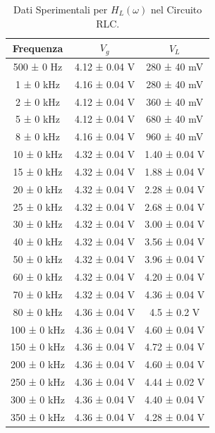 \documentclass[a4paper]{article}
\begin{document}
\begin{table}[htbp]
\centering
\begin{tabular}{|c|c|c|}
\hline
Frequenza & $V_g$ & $V_L$ \\\hline\hline
500 ± 0 Hz & 4.12 ± 0.04 V & 280 ± 40 mV \\
1 ± 0 kHz & 4.16 ± 0.04 V & 280 ± 40 mV \\
2 ± 0 kHz & 4.12 ± 0.04 V & 360 ± 40 mV \\
5 ± 0 kHz & 4.12 ± 0.04 V & 680 ± 40 mV \\
8 ± 0 kHz & 4.16 ± 0.04 V & 960 ± 40 mV \\
10 ± 0 kHz & 4.32 ± 0.04 V & 1.40 ± 0.04 V \\
15 ± 0 kHz & 4.32 ± 0.04 V & 1.88 ± 0.04 V \\
20 ± 0 kHz & 4.32 ± 0.04 V & 2.28 ± 0.04 V \\
25 ± 0 kHz & 4.32 ± 0.04 V & 2.68 ± 0.04 V \\
30 ± 0 kHz & 4.32 ± 0.04 V & 3.00 ± 0.04 V \\
40 ± 0 kHz & 4.32 ± 0.04 V & 3.56 ± 0.04 V \\
50 ± 0 kHz & 4.32 ± 0.04 V & 3.96 ± 0.04 V \\
60 ± 0 kHz & 4.32 ± 0.04 V & 4.20 ± 0.04 V \\
70 ± 0 kHz & 4.32 ± 0.04 V & 4.36 ± 0.04 V \\
80 ± 0 kHz & 4.36 ± 0.04 V & 4.5 ± 0.2 V \\
100 ± 0 kHz & 4.36 ± 0.04 V & 4.60 ± 0.04 V \\
150 ± 0 kHz & 4.36 ± 0.04 V & 4.72 ± 0.04 V \\
200 ± 0 kHz & 4.36 ± 0.04 V & 4.60 ± 0.04 V \\
250 ± 0 kHz & 4.36 ± 0.04 V & 4.44 ± 0.02 V \\
300 ± 0 kHz & 4.36 ± 0.04 V & 4.40 ± 0.04 V \\
350 ± 0 kHz & 4.36 ± 0.04 V & 4.28 ± 0.04 V \\
\hline
\end{tabular}
\caption{Dati Sperimentali per $H_L(\omega)$ nel Circuito RLC.}
\label{tab:dati_rlc_hl}
\end{table}
\end{document}
